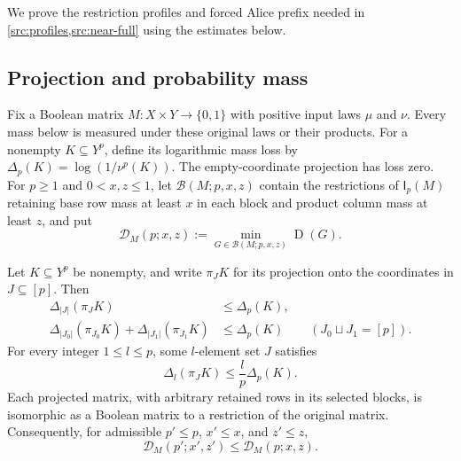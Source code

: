 \documentclass[11pt]{article} \usepackage[utf8]{inputenc}
\theoremstyle{plain} \newtheorem{theorem}{Theorem}[section]
\theoremstyle{definition} \newaliascnt{definition}{theorem}
\newcommand{\D}{\operatorname{D}}
\newcommand{\Int}[2]{\mathsf{I}_{#1}(#2)}
\newcommand{\card}[1]{\lvert#1\rvert}
\begin{document}
We prove the restriction profiles and forced Alice prefix needed in
\cref{src:profiles,src:near-full} using the estimates below.

\subsection{Projection and probability mass}

Fix a Boolean matrix $M:X\times Y\to\{0,1\}$ with positive input laws $\mu$ and
$\nu$. Every mass below is measured under these original laws or their products.
For a nonempty $K\subseteq Y^p$, define its logarithmic mass loss by
$\Delta_p(K)=\log(1/\nu^p(K))$. The empty-coordinate projection has loss zero.
For $p\ge1$ and $0<x,z\le1$, let $\mathcal B(M;p,x,z)$ contain the restrictions
of $\Int{p}{M}$ retaining base row mass at least $x$ in each block and product
column mass at least $z$, and put
\[
\mathcal D_M(p;x,z):=\min_{G\in\mathcal B(M;p,x,z)}\D(G).
\]

\begin{lemma}\label{cl:projection}
Let $K\subseteq Y^p$ be nonempty, and write $\pi_JK$ for its projection onto the
coordinates in $J\subseteq[p]$. Then
\begin{align*}
 \Delta_{\card J}(\pi_JK)&\le\Delta_p(K),\\
 \Delta_{\card{J_0}}(\pi_{J_0}K)+\Delta_{\card{J_1}}(\pi_{J_1}K)
 &\le\Delta_p(K) &&(J_0\sqcup J_1=[p]).
\end{align*}
For every integer $1\le l\le p$, some $l$-element set $J$ satisfies
\[
\Delta_l(\pi_JK)\le\frac lp\Delta_p(K).
\]
Each projected matrix, with arbitrary retained rows in its selected blocks, is
isomorphic as a Boolean matrix to a restriction of the original matrix.
Consequently, for admissible
$p'\le p$, $x'\le x$, and $z'\le z$,
\[
\mathcal D_M(p';x',z')\le\mathcal D_M(p;x,z).
\]
\end{lemma}
\end{document}
